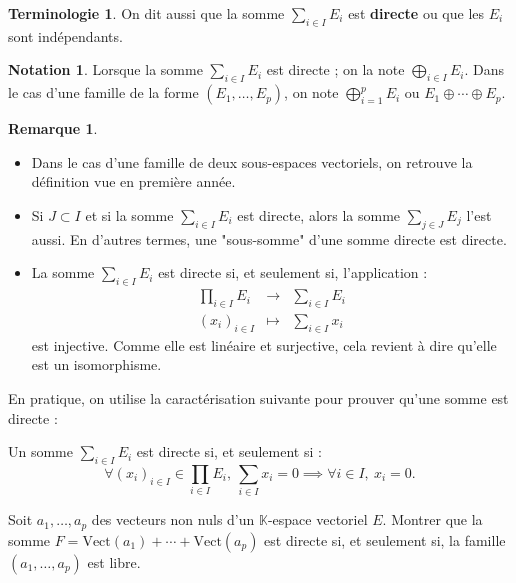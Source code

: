 \documentclass[french]{article}
\newcommand{\K}{\mathbb{K}}
\newcommand{\Vect}{\text{Vect}}
\theoremstyle{plain}
\theoremstyle{definition}
\newtheorem*{rmq}{Remarque}
\newtheorem*{notation}{Notation}
\newtheorem*{terminologie}{Terminologie}
\theoremstyle{remark}
\begin{document}
\begin{terminologie}
	On dit aussi que la somme $\displaystyle\sum_{i\in I}E_i$ est \textbf{directe} ou que les $E_i$ sont indépendants.
\end{terminologie}

\begin{notation}
	Lorsque la somme $\displaystyle\sum_{i\in I} E_i$ est directe ; on la note $\displaystyle\bigoplus_{i\in I}E_i$. Dans le cas d'une famille de la forme $(E_1,\ldots,E_p)$, on note $\displaystyle\bigoplus_{i=1}^pE_i$ ou $E_1\oplus\cdots\oplus E_p$.
\end{notation}

\begin{rmq}
	\begin{itemize}
		\item Dans le cas d'une famille de deux sous-espaces vectoriels, on retrouve la définition vue en première année.
		\item Si $J\subset I$ et si la somme $\displaystyle\sum_{i\in I} E_i$ est directe, alors la somme $\displaystyle\sum_{j\in J} E_j$ l'est aussi. En d'autres termes, une "sous-somme" d'une somme directe est directe.
		\item La somme $\displaystyle\sum_{i\in I} E_i$ est directe si, et seulement si, l'application : $$\begin{array}{rcl}
				\displaystyle\prod_{i\in I} E_i&\longrightarrow&\displaystyle\sum_{i\in I} E_i\\
					(x_i)_{i\in I}&\longmapsto&\displaystyle\sum_{i\in I}x_i
			\end{array}$$ est injective. Comme elle est linéaire et surjective, cela revient à dire qu'elle est un isomorphisme.
	\end{itemize}
\end{rmq}

En pratique, on utilise la caractérisation suivante pour prouver qu'une somme est directe :

\begin{prop}{}%
	Un somme $\displaystyle\sum_{i\in I}E_i$ est directe si, et seulement si : $$\forall (x_i)_{i\in I}\in\prod_{i\in I}E_i,\ \sum_{i\in I}x_i=0\implies\forall i\in I,\ x_i=0.$$
\end{prop}

\begin{exo}
	Soit $a_1,\ldots,a_p$ des vecteurs non nuls d'un $\K$-espace vectoriel $E$. Montrer que la somme $F=\Vect(a_1)+\cdots+\Vect(a_p)$ est directe si, et seulement si, la famille $(a_1,\ldots,a_p)$ est libre.
\end{exo}
\end{document}
